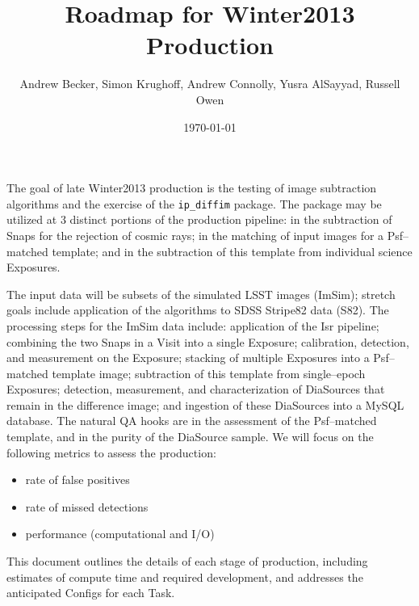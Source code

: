 \documentclass[12pt]{article}
\author{Andrew Becker, Simon Krughoff, Andrew Connolly, Yusra AlSayyad, Russell Owen}
\title{Roadmap for Winter2013 Production}
\date{\today}
\begin{document}
\maketitle

The goal of late Winter2013 production is the testing of image
subtraction algorithms and the exercise of the {\tt ip\_diffim}
package.  The package may be utilized at 3 distinct portions of the
production pipeline: in the subtraction of Snaps for the rejection of
cosmic rays; in the matching of input images for a Psf--matched
template; and in the subtraction of this template from individual
science Exposures.

The input data will be subsets of the simulated LSST images (ImSim);
stretch goals include application of the algorithms to SDSS Stripe82
data (S82).  The processing steps for the ImSim data include:
application of the Isr pipeline; combining the two Snaps in a Visit
into a single Exposure; calibration, detection, and measurement on the
Exposure; stacking of multiple Exposures into a Psf--matched template
image; subtraction of this template from single--epoch Exposures;
detection, measurement, and characterization of DiaSources that remain
in the difference image; and ingestion of these DiaSources into a
MySQL database.  The natural QA hooks are in the assessment of the
Psf--matched template, and in the purity of the DiaSource sample.  We
will focus on the following metrics to assess the production:
\begin{itemize}
\item rate of false positives
\item rate of missed detections
\item performance (computational and I/O)
\end{itemize}
This document outlines the details of each stage of production, 
including estimates of compute time and required development, and addresses the anticipated
Configs for each Task.

\clearpage
\tableofcontents
\clearpage

\end{document}
